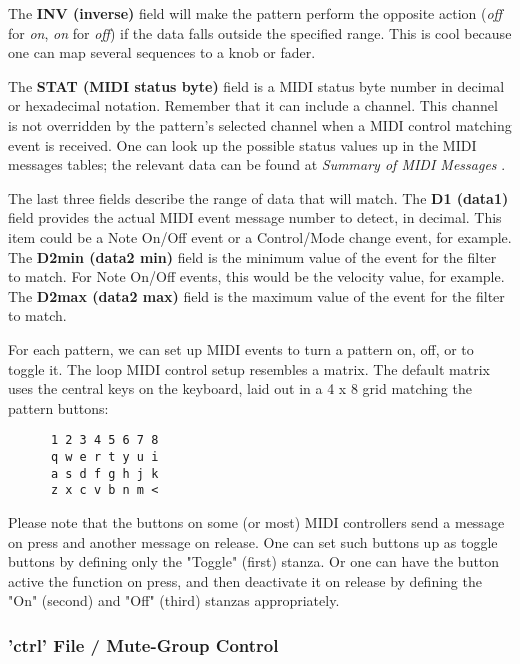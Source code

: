   The \textbf{INV (inverse)} field will make the pattern perform the opposite
   action (\textsl{off} for \textsl{on}, \textsl{on} for \textsl{off}) if the
   data falls outside the specified range.  This is cool because one can map
   several sequences to a knob or fader.

   The \textbf{STAT (MIDI status byte)} field is a MIDI status byte number in
   decimal or hexadecimal notation.
   Remember that it can include a channel.  This channel is not overridden by
   the pattern's selected channel when a MIDI control matching event is
   received. 
   One can look up the possible status values up in the MIDI messages tables;
   the relevant data can be found at
   \textsl{Summary of MIDI Messages} \cite{midicontroltable}.

   The last three fields describe the range of data that will match.  The
   \textbf{D1 (data1)} field provides the actual MIDI event message number to
   detect, in decimal.  This item could be a Note On/Off event or a
   Control/Mode change event, for example.
   The \textbf{D2min (data2 min)} field is the minimum value of the event for
   the filter to match. For Note On/Off events, this would be the velocity
   value, for example.
   The \textbf{D2max (data2 max)} field is the maximum value of the event for
   the filter to match.


   For each pattern, we can set up MIDI events to turn a 
   pattern on, off, or to toggle it.
   The loop MIDI control setup resembles a matrix.  The default matrix
   uses the central keys on the keyboard, laid out in a 4 x 8 grid matching the
   pattern buttons:

   \begin{verbatim}
      1 2 3 4 5 6 7 8
      q w e r t y u i
      a s d f g h j k
      z x c v b n m <
   \end{verbatim}

   Please note that the buttons on some (or most) MIDI controllers send a
   message on press and another message on release.  One can set such buttons
   up as toggle buttons by defining only the "Toggle" (first) stanza.
   Or one can have the button active the function on press, and then deactivate
   it on release by defining the "On" (second) and "Off" (third) stanzas
   appropriately.

\subsubsection{'ctrl' File / Mute-Group Control}
\label{subsubsec:configuration_ctrl_mute_group_control}

